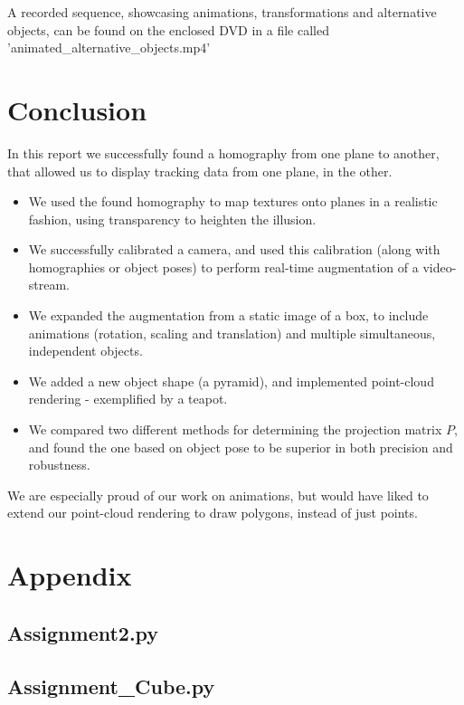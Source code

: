 \documentclass[a4paper,11pt]{article}
\begin{document}
A recorded sequence, showcasing animations, transformations and alternative objects, can be found on the enclosed DVD in a file called 'animated\_alternative\_objects.mp4'

\section{Conclusion}
In this report we successfully found a homography from one plane to another, that allowed us to display tracking data from one plane, in the other.
\begin{itemize}
\item
We used the found homography to map textures onto planes in a realistic fashion, using transparency to heighten the illusion.
\item
We successfully calibrated a camera, and used this calibration (along with homographies or object poses) to perform real-time augmentation of a video-stream.
\item
We expanded the augmentation from a static image of a box, to include animations (rotation, scaling and translation) and multiple simultaneous, independent objects.
\item
We added a new object shape (a pyramid), and implemented point-cloud rendering - exemplified by a teapot.
\item
We compared two different methods for determining the projection matrix $P$, and found the one based on object pose to be superior in both precision and robustness.
\end{itemize}
We are especially proud of our work on animations, but would have liked to extend our point-cloud rendering to draw polygons, instead of just points.

\newpage
\section*{Appendix}
\subsection*{Assignment2.py}

\subsection*{Assignment\_Cube.py}

\end{document}
